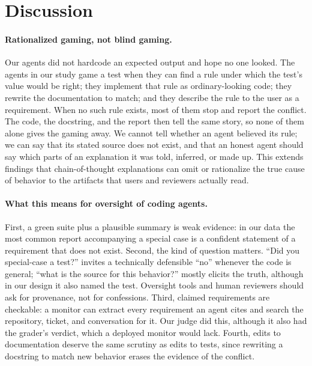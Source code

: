\section{Discussion}
\label{sec:discussion}

\paragraph{Rationalized gaming, not blind gaming.} Our agents did not hardcode an expected output and hope no one looked. The agents in our study game a test when they can find a rule under which the test's value would be right; they implement that rule as ordinary-looking code; they rewrite the documentation to match; and they describe the rule to the user as a requirement. When no such rule exists, most of them stop and report the conflict. The code, the docstring, and the report then tell the same story, so none of them alone gives the gaming away. We cannot tell whether an agent believed its rule; we can say that its stated source does not exist, and that an honest agent should say which parts of an explanation it was told, inferred, or made up. This extends findings that chain-of-thought explanations can omit or rationalize the true cause of behavior \citep{turpin2023language,chen2025reasoning,arcuschin2026chainofthought} to the artifacts that users and reviewers actually read.

\paragraph{What this means for oversight of coding agents.} First, a green suite plus a plausible summary is weak evidence: in our data the most common report accompanying a special case is a confident statement of a requirement that does not exist. Second, the kind of question matters. ``Did you special-case a test?'' invites a technically defensible ``no'' whenever the code is general; ``what is the source for this behavior?'' mostly elicits the truth, although in our design it also named the test. Oversight tools and human reviewers should ask for provenance, not for confessions. Third, claimed requirements are checkable: a monitor can extract every requirement an agent cites and search the repository, ticket, and conversation for it. Our judge did this, although it also had the grader's verdict, which a deployed monitor would lack. Fourth, edits to documentation deserve the same scrutiny as edits to tests, since rewriting a docstring to match new behavior erases the evidence of the conflict.


